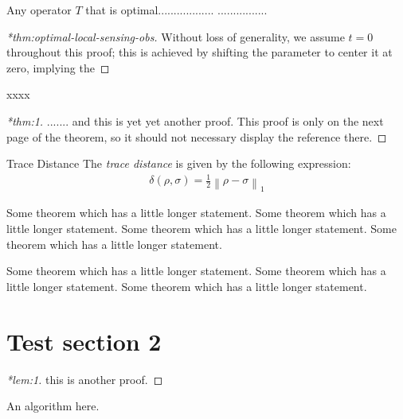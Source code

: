 \documentclass[%
  aps,%
  pra,%
  superscriptaddress,%
  reprint,%
  longbibliography,%
  nofootinbib,%
  notitlepage]{revtex4-2}
\begin{document}
\begin{proposition}
  \label{thm:optimal-local-sensing-obs}
  Any operator $T$ that is optimal.................. ................
\end{proposition}


\begin{proof}[*thm:optimal-local-sensing-obs]
  Without loss of generality, we assume $t=0$ throughout this proof; this is
  achieved by shifting the parameter to center it at zero, implying the
\end{proof}


xxxx
\begin{proof}[*thm:1]
  ....... and this is yet yet another proof.  This proof is only on the next page of the
  theorem, so it should not necessary display the reference there.
\end{proof}

\begin{thmheading}{Trace Distance}
  \label{thmheading:trace-dist}
  The \emph{trace distance} is given by the following expression:
  \begin{align}
    \delta(\rho,\sigma) = \frac12 \left\lVert \rho - \sigma \right\rVert_1
  \end{align}
\end{thmheading}

\begin{theorem}
  \label{thm:long}
  Some theorem which has a little longer statement.
  Some theorem which has a little longer statement.
  Some theorem which has a little longer statement.
  Some theorem which has a little longer statement.

  Some theorem which has a little longer statement.
  Some theorem which has a little longer statement.
  Some theorem which has a little longer statement.
\end{theorem}

\cleardoublepage

\section{Test section 2}

\begin{proof}[*lem:1]
  this is another proof.
\end{proof}

\begin{algorithm}
  \label{algo:1}
  An algorithm here.
\end{algorithm}
\end{document}
